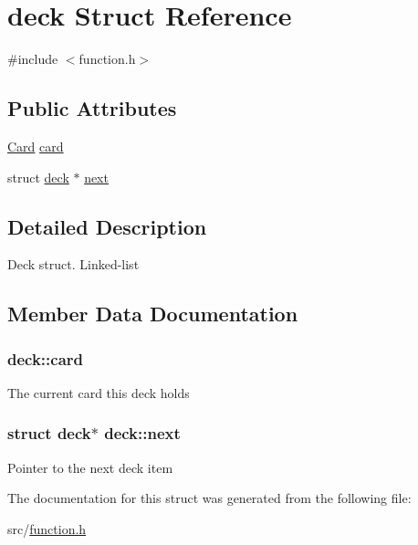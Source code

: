 \hypertarget{structdeck}{\section{deck Struct Reference}
\label{structdeck}
}


{\ttfamily \#include $<$function.\+h$>$}

\subsection*{Public Attributes}
\begin{DoxyCompactItemize}
\item 
\hyperlink{function_8h_ad1f7779f2f0f1933baa78d5cbd851b14}{Card} \hyperlink{structdeck_ac190db9cd98913ccf1624abaf4634340}{card}
\item 
struct \hyperlink{structdeck}{deck} $\ast$ \hyperlink{structdeck_a772ea8aa145065f4a2c84fab468ae6ea}{next}
\end{DoxyCompactItemize}


\subsection{Detailed Description}
Deck struct. Linked-\/list 

\subsection{Member Data Documentation}
\hypertarget{structdeck_ac190db9cd98913ccf1624abaf4634340}{
\subsubsection[{card}]{ deck\+::card}}\label{structdeck_ac190db9cd98913ccf1624abaf4634340}
The current card this deck holds \hypertarget{structdeck_a772ea8aa145065f4a2c84fab468ae6ea}{
\subsubsection[{next}]{\setlength{\rightskip}{0pt plus 5cm}struct {\bf deck}$\ast$ deck\+::next}}\label{structdeck_a772ea8aa145065f4a2c84fab468ae6ea}
Pointer to the next deck item 

The documentation for this struct was generated from the following file\+:\begin{DoxyCompactItemize}
\item 
src/\hyperlink{function_8h}{function.\+h}\end{DoxyCompactItemize}
